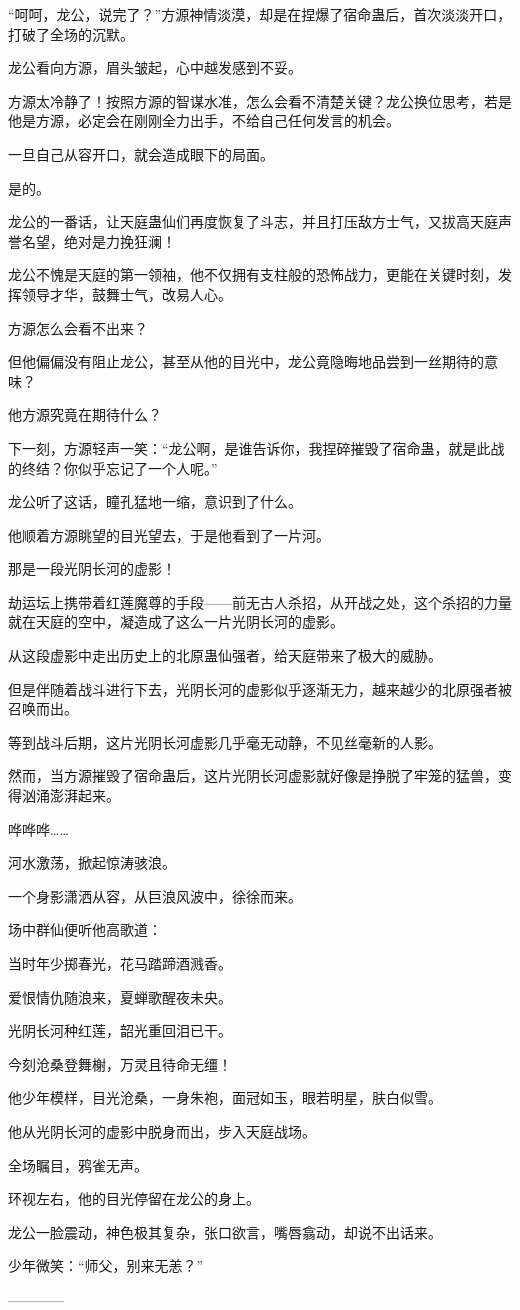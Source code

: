 \begin{this_body}
“呵呵，龙公，说完了？”方源神情淡漠，却是在捏爆了宿命蛊后，首次淡淡开口，打破了全场的沉默。

龙公看向方源，眉头皱起，心中越发感到不妥。

方源太冷静了！按照方源的智谋水准，怎么会看不清楚关键？龙公换位思考，若是他是方源，必定会在刚刚全力出手，不给自己任何发言的机会。

一旦自己从容开口，就会造成眼下的局面。

是的。

龙公的一番话，让天庭蛊仙们再度恢复了斗志，并且打压敌方士气，又拔高天庭声誉名望，绝对是力挽狂澜！

龙公不愧是天庭的第一领袖，他不仅拥有支柱般的恐怖战力，更能在关键时刻，发挥领导才华，鼓舞士气，改易人心。

方源怎么会看不出来？

但他偏偏没有阻止龙公，甚至从他的目光中，龙公竟隐晦地品尝到一丝期待的意味？

他方源究竟在期待什么？

下一刻，方源轻声一笑：“龙公啊，是谁告诉你，我捏碎摧毁了宿命蛊，就是此战的终结？你似乎忘记了一个人呢。”

龙公听了这话，瞳孔猛地一缩，意识到了什么。

他顺着方源眺望的目光望去，于是他看到了一片河。

那是一段光阴长河的虚影！

劫运坛上携带着红莲魔尊的手段——前无古人杀招，从开战之处，这个杀招的力量就在天庭的空中，凝造成了这么一片光阴长河的虚影。

从这段虚影中走出历史上的北原蛊仙强者，给天庭带来了极大的威胁。

但是伴随着战斗进行下去，光阴长河的虚影似乎逐渐无力，越来越少的北原强者被召唤而出。

等到战斗后期，这片光阴长河虚影几乎毫无动静，不见丝毫新的人影。

然而，当方源摧毁了宿命蛊后，这片光阴长河虚影就好像是挣脱了牢笼的猛兽，变得汹涌澎湃起来。

哗哗哗……

河水激荡，掀起惊涛骇浪。

一个身影潇洒从容，从巨浪风波中，徐徐而来。

场中群仙便听他高歌道：

当时年少掷春光，花马踏蹄酒溅香。

爱恨情仇随浪来，夏蝉歌醒夜未央。

光阴长河种红莲，韶光重回泪已干。

今刻沧桑登舞榭，万灵且待命无缰！

他少年模样，目光沧桑，一身朱袍，面冠如玉，眼若明星，肤白似雪。

他从光阴长河的虚影中脱身而出，步入天庭战场。

全场瞩目，鸦雀无声。

环视左右，他的目光停留在龙公的身上。

龙公一脸震动，神色极其复杂，张口欲言，嘴唇翕动，却说不出话来。

少年微笑：“师父，别来无恙？”

------------

\end{this_body}

